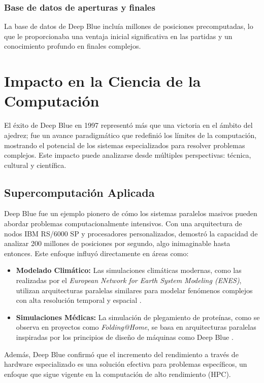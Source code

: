 \documentclass[12pt,a4paper]{article}
\begin{document}
\subsubsection*{Base de datos de aperturas y finales}
La base de datos de Deep Blue incluía millones de posiciones precomputadas, lo que le proporcionaba una ventaja inicial significativa en las partidas y un conocimiento profundo en finales complejos.

\section{Impacto en la Ciencia de la Computación}

El éxito de Deep Blue en 1997 representó más que una victoria en el ámbito del ajedrez; fue un avance paradigmático que redefinió los límites de la computación, mostrando el potencial de los sistemas especializados para resolver problemas complejos. Este impacto puede analizarse desde múltiples perspectivas: técnica, cultural y científica.

\subsection{Supercomputación Aplicada}

Deep Blue fue un ejemplo pionero de cómo los sistemas paralelos masivos pueden abordar problemas computacionalmente intensivos. Con una arquitectura de nodos IBM RS/6000 SP y procesadores personalizados, demostró la capacidad de analizar 200 millones de posiciones por segundo, algo inimaginable hasta entonces. Este enfoque influyó directamente en áreas como:

\begin{itemize}
    \item \textbf{Modelado Climático:} Las simulaciones climáticas modernas, como las realizadas por el \textit{European Network for Earth System Modeling (ENES)}, utilizan arquitecturas paralelas similares para modelar fenómenos complejos con alta resolución temporal y espacial \cite{andre2014high}.
    \item \textbf{Simulaciones Médicas:} La simulación de plegamiento de proteínas, como se observa en proyectos como \textit{Folding@Home}, se basa en arquitecturas paralelas inspiradas por los principios de diseño de máquinas como Deep Blue \cite{larson2009folding}.
\end{itemize}

Además, Deep Blue confirmó que el incremento del rendimiento a través de hardware especializado es una solución efectiva para problemas específicos, un enfoque que sigue vigente en la computación de alto rendimiento (HPC).
\end{document}
